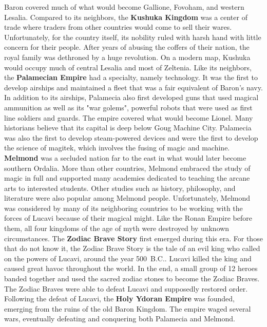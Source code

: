 Baron covered much of what would become Gallione, Fovoham, and western Lesalia.  
Compared to its neighbors, the \textbf{Kushuka Kingdom} was a center of trade where traders from other countries would come to sell their wares. 
Unfortunately, for the country itself, its nobility ruled with harsh hand with little concern for their people.
After years of abusing the coffers of their nation, the royal family was dethroned by a huge revolution. 
On a modern map, Kushuka would occupy much of central Lesalia and most of Zeltenia.
Like its neighbors, the \textbf{Palamecian Empire} had a specialty, namely technology. 
It was the first to develop airships and maintained a fleet that was a fair equivalent of Baron's navy. 
In addition to its airships, Palamecia also first developed guns that used magical ammunition as well as its "war golems", powerful robots that were used as first line soldiers and guards. 
The empire covered what would become Lionel. 
Many historians believe that its capital is deep below Goug Machine City. 
Palamecia was also the first to develop steam-powered devices and were the first to develop the science of magitek, which involves the fusing of magic and machine.
\textbf{Melmond} was a secluded nation far to the east in what would later become southern Ordalia. 
More than other countries, Melmond embraced the study of magic in full and supported many academies dedicated to teaching the arcane arts to interested students. 
Other studies such as history, philosophy, and literature were also popular among Melmond people. 
Unfortunately, Melmond was considered by many of its neighboring countries to be working with the forces of Lucavi because of their magical might.
Like the Ronan Empire before them, all four kingdoms of the age of myth were destroyed by unknown circumstances. 
The \textbf{Zodiac Brave Story} first emerged during this era. 
For those that do not know it, the Zodiac Brave Story is the tale of an evil king who called on the powers of Lucavi, around the year 500~B.C..
Lucavi killed the king and caused great havoc throughout the world. 
In the end, a small group of 12 heroes banded together and used the sacred zodiac stones to become the Zodiac Braves. 
The Zodiac Braves were able to defeat Lucavi and supposedly restored order. 
Following the defeat of Lucavi, the \textbf{Holy Ydoran Empire} was founded, emerging from the ruins of the old Baron Kingdom.
The empire waged several wars, eventually defeating and conquering both Palamecia and Melmond.
%
\vfill
